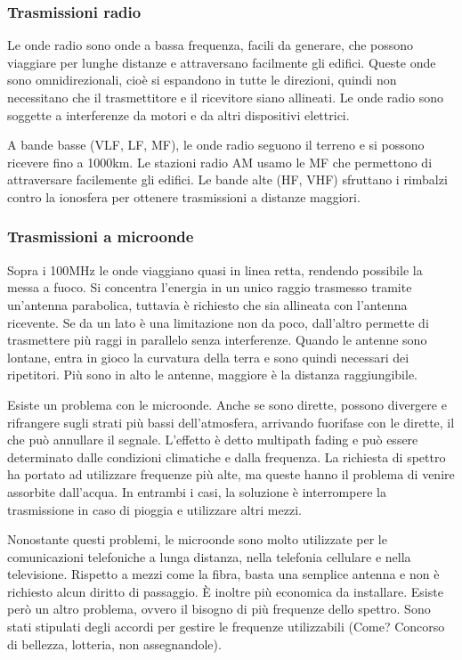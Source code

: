 \subsubsection{Trasmissioni radio}
Le onde radio sono onde a bassa frequenza, facili da generare, che possono viaggiare per lunghe distanze e attraversano facilmente gli edifici. 
Queste onde sono omnidirezionali, cioè si espandono in tutte le direzioni, quindi non necessitano che il trasmettitore e il ricevitore siano allineati.
Le onde radio sono soggette a interferenze da motori e da altri dispositivi elettrici.

A bande basse (VLF, LF, MF), le onde radio seguono il terreno e si possono ricevere fino a 1000km.
Le stazioni radio AM usamo le MF che permettono di attraversare facilemente gli edifici.
Le bande alte (HF, VHF) sfruttano i rimbalzi contro la ionosfera per ottenere trasmissioni a distanze maggiori.

\subsubsection{Trasmissioni a microonde}
Sopra i 100MHz le onde viaggiano quasi in linea retta, rendendo possibile la messa a fuoco.
Si concentra l'energia in un unico raggio trasmesso tramite un'antenna parabolica, tuttavia è richiesto che sia allineata con l'antenna ricevente.
Se da un lato è una limitazione non da poco, dall'altro permette di trasmettere più raggi in parallelo senza interferenze.
Quando le antenne sono lontane, entra in gioco la curvatura della terra e sono quindi necessari dei ripetitori.
Più sono in alto le antenne, maggiore è la distanza raggiungibile.

Esiste un problema con le microonde. Anche se sono dirette, possono divergere e rifrangere sugli strati più bassi dell'atmosfera, arrivando fuorifase con le dirette, il che può annullare il segnale.
L'effetto è detto multipath fading e può essere determinato dalle condizioni climatiche e dalla frequenza.
La richiesta di spettro ha portato ad utilizzare frequenze più alte, ma queste hanno il problema di venire assorbite dall'acqua. 
In entrambi i casi, la soluzione è interrompere la trasmissione in caso di pioggia e utilizzare altri mezzi.

Nonostante questi problemi, le microonde sono molto utilizzate per le comunicazioni telefoniche a lunga distanza, nella telefonia cellulare e nella televisione.
Rispetto a mezzi come la fibra, basta una semplice antenna e non è richiesto alcun diritto di passaggio. 
\`E inoltre più economica da installare.
Esiste però un altro problema, ovvero il bisogno di più frequenze dello spettro.
Sono stati stipulati degli accordi per gestire le frequenze utilizzabili (Come? Concorso di bellezza, lotteria, non assegnandole). 

